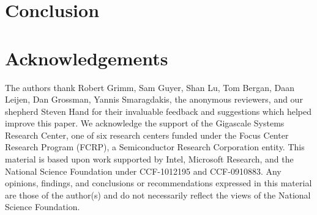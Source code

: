 \documentclass[9pt]{sigplanconf}
\newcommand{\punt}[1]{}
\begin{document}
\punt{
\section{Future Work}

}

\section{Conclusion}


\section{Acknowledgements}
The authors thank Robert Grimm, Sam Guyer, Shan Lu, Tom Bergan, Daan
Leijen, Dan Grossman, Yannis Smaragdakis, the anonymous reviewers, and our
shepherd Steven Hand for their invaluable feedback and suggestions which helped
improve this paper. We acknowledge the support of the Gigascale
Systems Research Center, one of six research centers funded under the
Focus Center Research Program (FCRP), a Semiconductor Research
Corporation entity.  This material is based upon work supported by
Intel, Microsoft Research, and the National Science Foundation under
CCF-1012195 and CCF-0910883. Any opinions, findings, and conclusions
or recommendations expressed in this material are those of the
author(s) and do not necessarily reflect the views of the National
Science Foundation.

{


}
\end{document}
